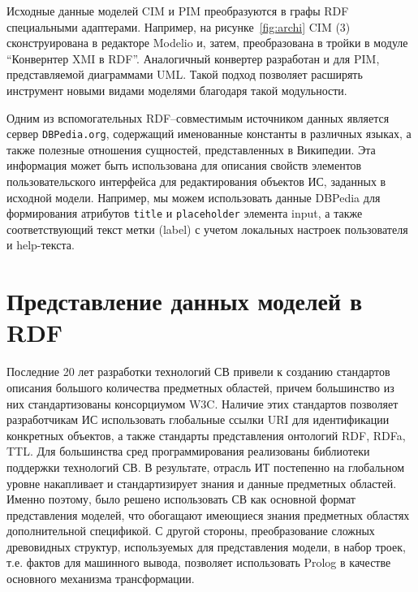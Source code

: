\documentclass[conference]{IEEEtran} \IEEEoverridecommandlockouts
\begin{document}
Исходные данные моделей CIM и PIM преобразуются в графы RDF специальными адаптерами. Например, на рисунке~\ref{fig:archi} CIM (3) сконструирована в редакторе Modelio \cite{modelio} и,  затем, преобразована в тройки в модуле ``Конвернтер XMI в RDF''. Аналогичный конвертер разработан и для PIM, представляемой диаграммами UML. Такой подход позволяет расширять инструмент новыми видами моделями благодаря такой модульности.

Одним из вспомогательных RDF--совместимым источником данных является сервер \texttt{DBPedia.org}, содержащий именованные константы в различных языках, а также полезные отношения сущностей, представленных в Википедии. Эта информация может быть использована для описания свойств элементов пользовательского интерфейса для редактирования объектов ИС, заданных в исходной модели. Например, мы можем использовать данные DBPedia для формирования атрибутов \texttt{title} и \texttt{placeholder} элемента input, а также соответствующий текст метки (label) с учетом локальных настроек пользователя и help-текста.

\section{Представление данных моделей в RDF} \label{sec:rdf-repr}

Последние 20 лет разработки технологий СВ привели к созданию стандартов описания большого количества предметных областей, причем большинство из них стандартизованы консорциумом W3C. Наличие этих стандартов позволяет разработчикам ИС использовать глобальные ссылки URI для идентификации конкретных объектов, а также стандарты представления онтологий RDF, RDFa, TTL.  Для большинства сред программирования реализованы библиотеки поддержки технологий СВ. В результате, отрасль ИТ постепенно на глобальном уровне накапливает и стандартизирует знания и данные предметных областей. Именно поэтому, было решено использовать СВ как основной формат представления моделей, что обогащают имеющиеся знания предметных областях дополнительной спецификой. С другой стороны, преобразование сложных древовидных структур, используемых для представления модели, в набор троек, т.е. фактов для машинного вывода, позволяет использовать Prolog в качестве основного механизма трансформации.
\end{document}

